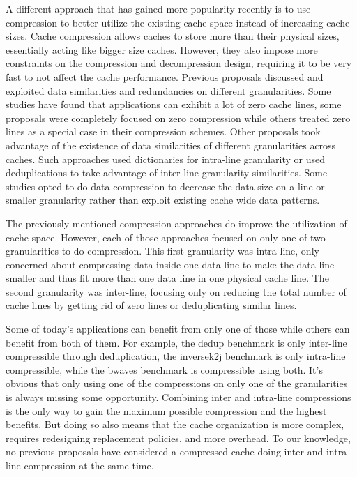 A different approach that has gained more popularity recently is to use compression to better utilize the existing cache space instead of increasing cache sizes. Cache compression allows caches to store more than their physical sizes, essentially acting like bigger size caches. However, they also impose more constraints on the compression and decompression design, requiring it to be very fast to not affect the cache performance. Previous proposals discussed and exploited data similarities and redundancies on different granularities. Some studies have found that applications can exhibit a lot of zero cache lines, some proposals were completely focused on zero compression\cite{zca} while others treated zero lines as a special case in their compression schemes\cite{fpc, hycomp, dedup}. Other proposals took advantage of the existence of data similarities of different granularities across caches. Such approaches used dictionaries for intra-line granularity\cite{cpack, dish} or used deduplications\cite{dedup} to take advantage of inter-line granularity similarities. Some studies opted to do data compression to decrease the data size on a line or smaller granularity rather than exploit existing cache wide data patterns\cite{bdi, sc2, hycomp}.\par
The previously mentioned compression approaches do improve the utilization of cache space. However, each of those approaches focused on only one of two granularities to do compression. This first granularity was intra-line, only concerned about compressing data inside one data line to make the data line smaller and thus fit more than one data line in one physical cache line. The second granularity was inter-line, focusing only on reducing the total number of cache lines by getting rid of zero lines or deduplicating similar lines.\par
Some of today's applications can benefit from only one of those while others can benefit from both of them. For example, the dedup\cite{parsec} benchmark is only inter-line compressible through deduplication\cite{dedup}, the inversek2j\cite{axbench} benchmark is only intra-line compressible, while the bwaves\cite{spec} benchmark is compressible using both. It's obvious that only using one of the compressions on only one of the granularities is always missing some opportunity. Combining inter and intra-line compressions is the only way to gain the maximum possible compression and the highest benefits. But doing so also means that the cache organization is more complex, requires redesigning replacement policies, and more overhead. To our knowledge, no previous proposals have considered a compressed cache doing inter and intra-line compression at the same time.\par
